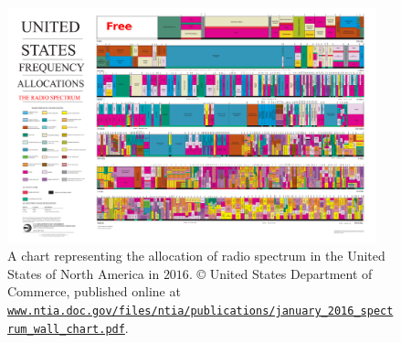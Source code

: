 \begin{figure}[h!]
    \centering
    \includegraphics[width=0.95\textwidth]{United_States_Frequency_Allocations_Chart_2016_The_Radio_Spectrum_3.pdf}
    \caption[A chart representing the allocation of radio spectrum in the United States of North America in $2016$]{A chart representing the allocation of radio spectrum in the United States of North America in $2016$. \copyright{} United States Department of Commerce, published online at \href{https://www.ntia.doc.gov/files/ntia/publications/january_2016_spectrum_wall_chart.pdf}{\texttt{www.ntia.doc.gov/files/ntia/publications/january\_2016\_spectrum\_wall\_chart.pdf}}.}
    \label{fig:1:United_States_Frequency_Allocations_Chart_2016_The_Radio_Spectrum}
\end{figure}

